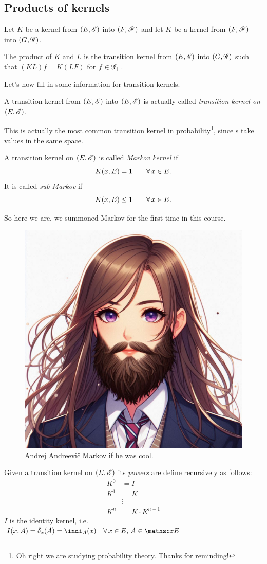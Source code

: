 \documentclass{report}
\begin{document}
\subsection{Products of kernels}
Let $K$ be a kernel from $(E,\mathscr{E})$ into $(F,\mathscr{F})$ and let $K$ be a kernel from $(F,\mathscr{F})$ into $(G,\mathscr{G})$.
\begin{definition}
	The product of $K$ and $L$ is the transition kernel from $(E,\mathscr{E})$ into $(G,\mathscr{G})$ such that $(KL)f=K(LF)$ for $f\in\mathscr{G}_+$.
\end{definition}
Let's now fill in some information for transition kernels.
\begin{definition}
	A transition kernel from $(E,\mathscr{E})$ into $(E,\mathscr{E})$ is actually called \emph{transition kernel on $(E,\mathscr{E})$}.
\end{definition}
This is actually the most common transition kernel in probability\footnote{Oh right we are studying probability theory. Thanks for reminding!}, since \rv s take values in the same space.
\begin{definition}
	A transition kernel on $(E,\mathscr{E})$ is called \emph{Markov kernel} if 
	\[K(x,E)=1\qquad\forall\, x\in E.\]
	It is called \emph{sub-Markov} if
	\[K(x,E)\leq1\qquad\forall\, x\in E.\]
\end{definition}
So here we are, we summoned Markov for the first time in this course.
\begin{figure}[H]
	\centering
	\includegraphics[width=0.4\linewidth]{markov}
	\caption{Andrej Andreevič Markov if he was cool.}
	\label{fig:markov}
\end{figure}
\begin{definition}
	Given a transition kernel on $(E,\mathscr{E})$ its \emph{powers} are define recursively as follows:
	\begin{align*}
		K^0&=I\\
		K^1&=K\\
		&\vdots\\
		K^n&=K\cdot K^{n-1}
	\end{align*}
	$I$ is the identity kernel, i.e. $I(x,A)=\delta_x(A)=\indi_A(x)\quad\every x\in E,\, A\in\E$
\end{definition}
\end{document}
